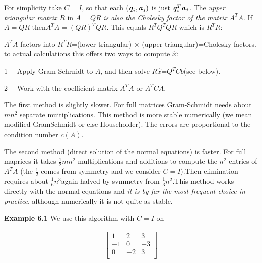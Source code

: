 For simplicity take $C=I$, so that each $(\textbf{\textit{q}}_{i}, \textbf{\textit{a}}_{j})$ is just $\textbf{\textit{q}}^{T}_{i}\textbf{\textit{a}}_{j} $. The \textit{upper triangular matrix} $R$ in $A=QR$ \textit{is also the Cholesky factor of the matrix} $A^{T}A$. If $A= QR$ then$A^{T}A=(QR)^{T}QR $. This equals $R^{T} Q^{T} QR$ which is $R^{T}R$:

$A^{T}A$ factors into $R^{T}R$=(lower triangular) $ \times$ (upper triangular)=Cholesky factors. to actual calculations this offers two ways to compute $\hat{x}$:

\begin{flushleft}
1 \ \  Apply Gram-Schrnidt to $A$, and then solve $R\hat{x}$=$Q^{T} C b $(see below).
\end{flushleft} 
\begin{flushleft}
2 \ \   Work with the coefficient matrix $A^{T}A$ or $A^{T}CA$.
\end{flushleft}

The first method is slightly slower. For full matrices Gram-Schmidt needs about $mn^{2}$ separate muitiplications. This method is more stable numerically (we mean modified GramSchmidt or else Householder). The errors are proportional to the condition number $c(A)$.

The second method (direct solution of the normal equations) is faster. For full maprices it takes $ \frac{1}{2}mn^{2}$ multiplications and additions to compute the $n^{2}$ entries of $A^{T}A$ (the  $ \frac{1}{2}$ comes from symmetry and we consider $C = I$).Then elimination requires about $ \frac{1}{6}n^{3}$again halved by svmmetrv from $\frac{1}{3}n^{2}$.This method works directly with the normal equations and \textit{it is by far the most frequent choice in practice}, although numerically it is not quite as stable.

\begin{flushleft}
	\textbf{Example 6.1} We use this algorithm with $C= I$ on
\end{flushleft}
\begin{align*}
\begin{bmatrix}
1&2&3 \\	
-1&0&-3 \\		
0&-2&3 \\	
\end{bmatrix}
\end{align*}

